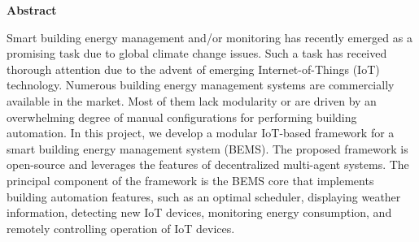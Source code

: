 
\begin{center}\textbf{Abstract}\end{center}


Smart building energy management and/or monitoring has recently emerged as a
promising task due to global climate change issues. Such a task has received thorough attention
due to the advent of emerging Internet-of-Things (IoT) technology. Numerous building energy
management systems are commercially available in the market. Most of them lack modularity
or are driven by an overwhelming degree of manual configurations for performing building
automation. In this project, we develop a modular IoT-based framework for a smart building
energy management system (BEMS). The proposed framework is open-source and leverages the
features of decentralized multi-agent systems. The principal component of the framework is the
BEMS core that implements building automation features, such as an optimal scheduler,
displaying weather information, detecting new IoT devices, monitoring energy consumption,
and remotely controlling operation of IoT devices.
\cleardoublepage


